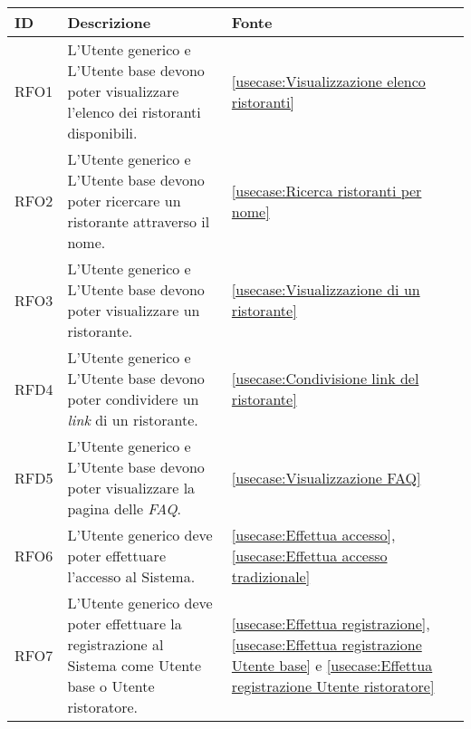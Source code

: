 \begin{table}[H]
	\renewcommand{\arraystretch}{1.5}
	\centering
	\begin{tabularx}{\textwidth}{l|X|p{2cm}}
		\textbf{ID} & \textbf{Descrizione}                                                                                       & \textbf{Fonte}                                                                                                                                               \\
		\hline
		RFO1        & L'Utente generico e L'Utente base devono poter visualizzare l'elenco dei ristoranti disponibili.           & \autoref{usecase:Visualizzazione elenco ristoranti}                                                                                                          \\
		\hline
		RFO2        & L'Utente generico e L'Utente base devono poter ricercare un ristorante attraverso il nome.				  & \autoref{usecase:Ricerca ristoranti per nome}                                                                                                                      \\
		\hline
		RFO3        & L'Utente generico e L'Utente base devono poter visualizzare un ristorante.                                 & \autoref{usecase:Visualizzazione di un ristorante}                                                                                                           \\
		\hline
		RFD4        & L'Utente generico e L'Utente base devono poter condividere un \textit{link} di un ristorante.              & \autoref{usecase:Condivisione link del ristorante}                                                                                                           \\
		\hline
		RFD5        & L'Utente generico e L'Utente base devono poter visualizzare la pagina delle  \textit{\ac{FAQ}}.            & \autoref{usecase:Visualizzazione FAQ}                                                                                                                        \\
		\hline
		RFO6        & L'Utente generico deve poter effettuare l'accesso al Sistema.                                              & \autoref{usecase:Effettua accesso}, \autoref{usecase:Effettua accesso tradizionale}                      \\
		\hline
		RFO7        & L'Utente generico deve poter effettuare la registrazione al Sistema come Utente base o Utente ristoratore. & \autoref{usecase:Effettua registrazione}, \autoref{usecase:Effettua registrazione Utente base} e \autoref{usecase:Effettua registrazione Utente ristoratore} \\

\end{tabularx}
\end{table}
